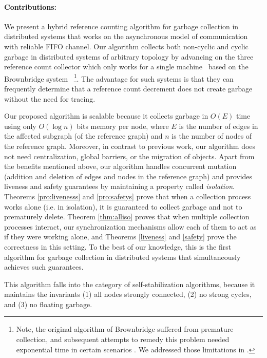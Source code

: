\paragraph{Contributions:}
We present a hybrid reference counting algorithm for garbage collection in
distributed systems that works on the asynchronous model of communication with
reliable FIFO channel. Our algorithm collects both
non-cyclic and cyclic garbage in distributed systems of arbitrary topology by advancing on the
three reference count collector which only works for a single machine~\cite{Brandt2014}
based on the Brownbridge system~\cite{Brownbridge1985} \footnote{
Note, the original algorithm of Brownbridge suffered from premature collection, and subsequent attempts to remedy this problem needed exponential time in certain scenarios \cite{Salkild1987,Pepels1988}. We addressed those limitations in \cite{Brandt2014}.
}. The advantage for such
systems is that they can frequently determine that a reference count decrement
does not create garbage without the need for tracing. 

Our proposed algorithm is scalable
because it collects garbage in $O(E)$ time using only $O(\log n)$ bits memory per
node, where $E$ is the number of edges in the affected subgraph (of the reference
graph) and $n$ is the number of nodes of the reference graph. Moreover, in
contrast to previous work, our algorithm does not need centralization,
global barriers, or the migration of objects. Apart from the benefits
mentioned above, our algorithm handles concurrent mutation (addition and deletion of edges and nodes in the reference graph) and provides liveness
and safety guarantees by maintaining a property called \emph{isolation}.
Theorems \ref{pro:livenesss} and \ref{pro:safetys} prove that when a
collection process works alone (i.e. in isolation), it is guaranteed to collect
garbage and not to prematurely delete. Theorem \ref{thm:alliso} proves that
when multiple collection processes interact, our synchronization mechanisms
allow each of them to act as if they were working alone, and Theorems
\ref{liveness} and \ref{safety} prove the correctness in this setting.
To the best of our knowledge, this is the first algorithm for garbage
collection in distributed systems that simultaneously achieves such guarantees.

This algorithm falls into the category of self-stabilization algorithms, because
it maintains the invariants (1) all nodes strongly connected, (2) no strong
cycles, and (3) no floating garbage.

